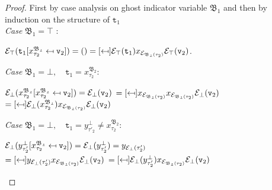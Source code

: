 \begin{proof}
First by case analysis on ghost indicator variable $\mathfrak{B_{1}}$ 
and then by induction on the structure of $\texttt{t}_{1}$  \\

\noindent\textit{Case} $\mathfrak{B_{1} = \top}$ :

\begin{center}
 $\e_{\top}
	(\sbst
		{\texttt{t}_{1}}
		{x^{\mathfrak{B_{2}}}_{\tau_{2}}}
		{\texttt{v}_{2}}) 
	= () 
	= \sbst
			{\e_{\top}(\texttt{t}_{1})}
			{x_{\e_{\mathfrak{B_{2}}(\tau_{2})}}}
			{\e_{\top}(\texttt{v}_{2})}$.
\end{center}

\noindent\textit{Case} $\mathfrak{B_{1} = \bot},\quad
\texttt{t}_{1} = x^{\mathfrak{B_{2}}}_{\tau_{2}}$:
\begin{center}
 $\mathcal{E}_{\bot}
	(x^{\mathfrak{B_{2}}}_{\tau_{2}} [x^{\mathfrak{B_{2}}}_{\tau_{2}} \mapsfrom \texttt{v}_{2}]) 
	= \mathcal{E}_{\bot}(\texttt{v}_{2}) $ 
	$= \sbst
			{x_{\e_{\mathfrak{B_{2}}(\tau_{2})}}}
			{x_{\e_{\mathfrak{B_{2}}(\tau_{2})}}}
			{\e_{\bot}(\texttt{v}_{2})}$ \\[0.08cm]
	$= \sbst
			{\e_{\bot}(x^{\mathfrak{B_{2}}}_{\tau_{2}})}
			{x_{\e_{\mathfrak{B_{2}}(\tau_{2})}}}
			{\e_{\bot}(\texttt{v}_{2})}$
\end{center}

\noindent\textit{Case} $\mathfrak{B_{1} = \bot},\quad
\texttt{t}_{1} = y^{\bot}_{\tau'_{2}} 
\neq x^{\mathfrak{B_{2}}}_{\tau_{2}}$:
\begin{center}
 $\mathcal{E}_{\bot}
	(y^{\bot}_{\tau'_{2}} [x^{\mathfrak{B_{2}}}_{\tau_{2}} \mapsfrom \texttt{v}_{2}]) 
	= \mathcal{E}_{\bot}(y^{\bot}_{\tau'_{2}}) = y_{\mathcal{E}_{\bot}(\tau'_{2})} $ \\[0.08cm]
	$  = \sbst
			{y_{\e_{\bot}(\tau'_{2})}}
			{x_{\e_{\mathfrak{B_{2}}(\tau_{2})}}}
			{\e_{\bot}(\texttt{v}_{2})}$ 
	$= \sbst
			{\e_{\bot}(y^{\bot}_{\tau'_{2}})}
			{x_{\e_{\mathfrak{B_{2}}(\tau_{2})}}}
			{\e_{\bot}(\texttt{v}_{2})}$
\end{center}


\end{proof}
